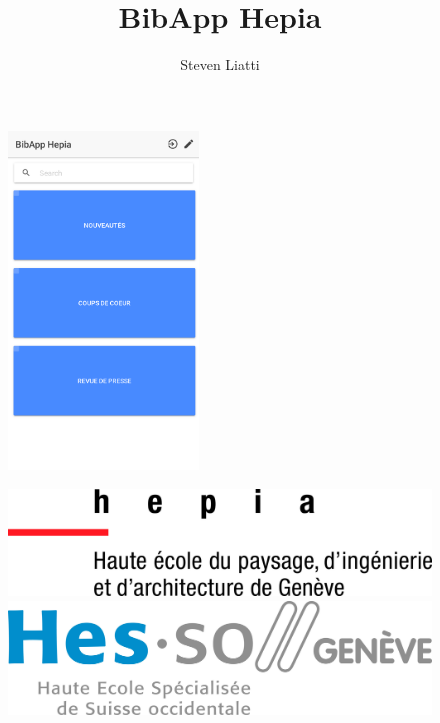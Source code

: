 \documentclass[a4paper, 12pt]{article}
\begin{document}
\title{BibApp Hepia}
\author{Steven Liatti}
\maketitle

\begin{figure}
	\begin{center}
		\includegraphics[width=0.45\textwidth]{images/screenshots/android1.png}
	\end{center}
\end{figure}

\begin{figure}[!b]
	\centering
	\begin{minipage}{.5\textwidth}
		\centering
		\includegraphics[width=.7\linewidth]{images/hepia.jpg}
	\end{minipage}%
	\begin{minipage}{.5\textwidth}
		\centering
		\includegraphics[width=.7\linewidth]{images/hesso.jpg}
	\end{minipage}
\end{figure}
\newpage
\end{document}
